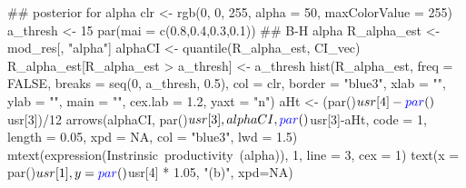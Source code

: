 \documentclass[11pt,]{article}
\newenvironment{Shaded}{}{}
\newcommand{\KeywordTok}[1]{\textcolor[rgb]{0.00,0.00,1.00}{#1}}
\newcommand{\DataTypeTok}[1]{#1}
\newcommand{\DecValTok}[1]{#1}
\newcommand{\FloatTok}[1]{#1}
\newcommand{\StringTok}[1]{\textcolor[rgb]{0.00,0.50,0.50}{#1}}
\newcommand{\OtherTok}[1]{\textcolor[rgb]{1.00,0.25,0.00}{#1}}
\newcommand{\OperatorTok}[1]{#1}
\newcommand{\NormalTok}[1]{#1}
\begin{document}
\begin{Shaded}
\begin{Highlighting}[]
\NormalTok{## posterior for alpha}
\NormalTok{clr <-}\StringTok{ }\KeywordTok{rgb}\NormalTok{(}\DecValTok{0}\NormalTok{, }\DecValTok{0}\NormalTok{, }\DecValTok{255}\NormalTok{, }\DataTypeTok{alpha =} \DecValTok{50}\NormalTok{, }\DataTypeTok{maxColorValue =} \DecValTok{255}\NormalTok{)}
\NormalTok{a_thresh <-}\StringTok{ }\DecValTok{15}
\KeywordTok{par}\NormalTok{(}\DataTypeTok{mai =} \KeywordTok{c}\NormalTok{(}\FloatTok{0.8}\NormalTok{,}\FloatTok{0.4}\NormalTok{,}\FloatTok{0.3}\NormalTok{,}\FloatTok{0.1}\NormalTok{))}
\NormalTok{## B-H alpha}
\NormalTok{R_alpha_est <-}\StringTok{ }\NormalTok{mod_res[, }\StringTok{"alpha"}\NormalTok{]}
\NormalTok{alphaCI <-}\StringTok{ }\KeywordTok{quantile}\NormalTok{(R_alpha_est, CI_vec)}
\NormalTok{R_alpha_est[R_alpha_est }\OperatorTok{>}\StringTok{ }\NormalTok{a_thresh] <-}\StringTok{ }\NormalTok{a_thresh}
\KeywordTok{hist}\NormalTok{(R_alpha_est, }\DataTypeTok{freq =} \OtherTok{FALSE}\NormalTok{, }\DataTypeTok{breaks =} \KeywordTok{seq}\NormalTok{(}\DecValTok{0}\NormalTok{, a_thresh, }\FloatTok{0.5}\NormalTok{),}
    \DataTypeTok{col =}\NormalTok{ clr, }\DataTypeTok{border =} \StringTok{"blue3"}\NormalTok{,}
    \DataTypeTok{xlab =} \StringTok{""}\NormalTok{, }\DataTypeTok{ylab =} \StringTok{""}\NormalTok{, }\DataTypeTok{main =} \StringTok{""}\NormalTok{, }\DataTypeTok{cex.lab =} \FloatTok{1.2}\NormalTok{, }\DataTypeTok{yaxt =} \StringTok{"n"}\NormalTok{)}
\NormalTok{aHt <-}\StringTok{ }\NormalTok{(}\KeywordTok{par}\NormalTok{()}\OperatorTok{$}\NormalTok{usr[}\DecValTok{4}\NormalTok{]}\OperatorTok{-}\KeywordTok{par}\NormalTok{()}\OperatorTok{$}\NormalTok{usr[}\DecValTok{3}\NormalTok{])}\OperatorTok{/}\DecValTok{12}
\KeywordTok{arrows}\NormalTok{(alphaCI, }\KeywordTok{par}\NormalTok{()}\OperatorTok{$}\NormalTok{usr[}\DecValTok{3}\NormalTok{], alphaCI,}\KeywordTok{par}\NormalTok{()}\OperatorTok{$}\NormalTok{usr[}\DecValTok{3}\NormalTok{]}\OperatorTok{-}\NormalTok{aHt,}
       \DataTypeTok{code =} \DecValTok{1}\NormalTok{, }\DataTypeTok{length =} \FloatTok{0.05}\NormalTok{, }\DataTypeTok{xpd =} \OtherTok{NA}\NormalTok{, }\DataTypeTok{col =} \StringTok{"blue3"}\NormalTok{, }\DataTypeTok{lwd =} \FloatTok{1.5}\NormalTok{)}
\KeywordTok{mtext}\NormalTok{(}\KeywordTok{expression}\NormalTok{(Instrinsic}\OperatorTok{~}\NormalTok{productivity}\OperatorTok{~}\NormalTok{(alpha)), }\DecValTok{1}\NormalTok{, }\DataTypeTok{line =} \DecValTok{3}\NormalTok{, }\DataTypeTok{cex =} \DecValTok{1}\NormalTok{)}
\KeywordTok{text}\NormalTok{(}\DataTypeTok{x =} \KeywordTok{par}\NormalTok{()}\OperatorTok{$}\NormalTok{usr[}\DecValTok{1}\NormalTok{],}
     \DataTypeTok{y =} \KeywordTok{par}\NormalTok{()}\OperatorTok{$}\NormalTok{usr[}\DecValTok{4}\NormalTok{] }\OperatorTok{*}\StringTok{ }\FloatTok{1.05}\NormalTok{,}
     \StringTok{"(b)"}\NormalTok{, }\DataTypeTok{xpd=}\OtherTok{NA}\NormalTok{)}



\end{Highlighting}
\end{Shaded}
\end{document}
